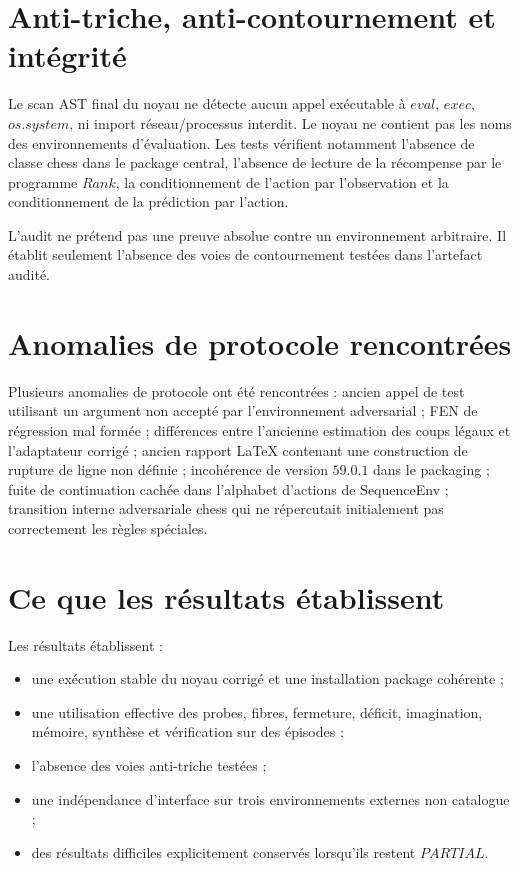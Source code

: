 \documentclass[11pt,a4paper]{article}
\begin{document}
\section{Anti-triche, anti-contournement et intégrité}
Le scan AST final du noyau ne détecte aucun appel exécutable à $eval$, $exec$, $os.system$, ni import réseau/processus interdit. Le noyau ne contient pas les noms des environnements d'évaluation. Les tests vérifient notamment l'absence de classe chess dans le package central, l'absence de lecture de la récompense par le programme $Rank$, la conditionnement de l'action par l'observation et la conditionnement de la prédiction par l'action.

L'audit ne prétend pas une preuve absolue contre un environnement arbitraire. Il établit seulement l'absence des voies de contournement testées dans l'artefact audité.

\section{Anomalies de protocole rencontrées}
Plusieurs anomalies de protocole ont été rencontrées : ancien appel de test utilisant un argument non accepté par l’environnement adversarial ; FEN de régression mal formée ; différences entre l’ancienne estimation des coups légaux et l’adaptateur corrigé ; ancien rapport LaTeX contenant une construction de rupture de ligne non définie ; incohérence de version $59.0.1$ dans le packaging ; fuite de continuation cachée dans l’alphabet d’actions de SequenceEnv ; transition interne adversariale chess qui ne répercutait initialement pas correctement les règles spéciales.

\section{Ce que les résultats établissent}
Les résultats établissent :
\begin{itemize}
\item une exécution stable du noyau corrigé et une installation package cohérente ;
\item une utilisation effective des probes, fibres, fermeture, déficit, imagination, mémoire, synthèse et vérification sur des épisodes ;
\item l'absence des voies anti-triche testées ;
\item une indépendance d'interface sur trois environnements externes non catalogue ;
\item des résultats difficiles explicitement conservés lorsqu'ils restent $PARTIAL$.
\end{itemize}
\end{document}
